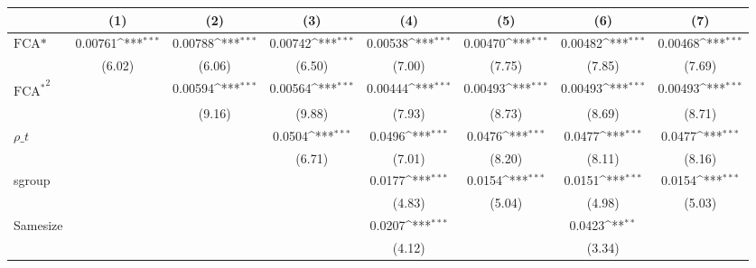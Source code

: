 {
\def\sym#1{\ifmmode^{#1}\else\(^{#1}\)\fi}
\begin{tabular}{l*{7}{c}}
\hline\hline
                    &\multicolumn{1}{c}{(1)}         &\multicolumn{1}{c}{(2)}         &\multicolumn{1}{c}{(3)}         &\multicolumn{1}{c}{(4)}         &\multicolumn{1}{c}{(5)}         &\multicolumn{1}{c}{(6)}         &\multicolumn{1}{c}{(7)}         \\
\hline
$ \text{FCA*} $     &     0.00761\sym{***}&     0.00788\sym{***}&     0.00742\sym{***}&     0.00538\sym{***}&     0.00470\sym{***}&     0.00482\sym{***}&     0.00468\sym{***}\\
                    &      (6.02)         &      (6.06)         &      (6.50)         &      (7.00)         &      (7.75)         &      (7.85)         &      (7.69)         \\
[1em]
$ { \text{FCA}^ * } ^ 2$&                     &     0.00594\sym{***}&     0.00564\sym{***}&     0.00444\sym{***}&     0.00493\sym{***}&     0.00493\sym{***}&     0.00493\sym{***}\\
                    &                     &      (9.16)         &      (9.88)         &      (7.93)         &      (8.73)         &      (8.69)         &      (8.71)         \\
[1em]
 $ \rho\_t $         &                     &                     &      0.0504\sym{***}&      0.0496\sym{***}&      0.0476\sym{***}&      0.0477\sym{***}&      0.0477\sym{***}\\
                    &                     &                     &      (6.71)         &      (7.01)         &      (8.20)         &      (8.11)         &      (8.16)         \\
[1em]
sgroup              &                     &                     &                     &      0.0177\sym{***}&      0.0154\sym{***}&      0.0151\sym{***}&      0.0154\sym{***}\\
                    &                     &                     &                     &      (4.83)         &      (5.04)         &      (4.98)         &      (5.03)         \\
[1em]
Samesize            &                     &                     &                     &      0.0207\sym{***}&                     &      0.0423\sym{**} &                     \\
                    &                     &                     &                     &      (4.12)         &                     &      (3.34)         &                     \\

\end{tabular}}
